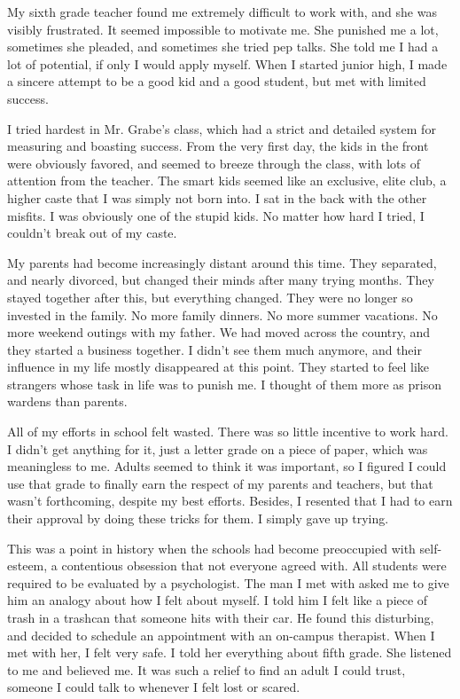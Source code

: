 My sixth grade teacher found me extremely difficult to work with, and she was visibly frustrated. It seemed impossible to motivate me. She punished me a lot, sometimes she pleaded, and sometimes she tried pep talks. She told me I had a lot of potential, if only I would apply myself. When I started junior high, I made a sincere attempt to be a good kid and a good student, but met with limited success.

I tried hardest in Mr. Grabe's class, which had a strict and detailed system for measuring and boasting success. From the very first day, the kids in the front were obviously favored, and seemed to breeze through the class, with lots of attention from the teacher. The smart kids seemed like an exclusive, elite club, a higher caste that I was simply not born into. I sat in the back with the other misfits. I was obviously one of the stupid kids. No matter how hard I tried, I couldn't break out of my caste.

My parents had become increasingly distant around this time. They separated, and nearly divorced, but changed their minds after many trying months. They stayed together after this, but everything changed. They were no longer so invested in the family. No more family dinners. No more summer vacations. No more weekend outings with my father. We had moved across the country, and they started a business together. I didn't see them much anymore, and their influence in my life mostly disappeared at this point. They started to feel like strangers whose task in life was to punish me. I thought of them more as prison wardens than parents.

All of my efforts in school felt wasted. There was so little incentive to work hard. I didn't get anything for it, just a letter grade on a piece of paper, which was meaningless to me. Adults seemed to think it was important, so I figured I could use that grade to finally earn the respect of my parents and teachers, but that wasn't forthcoming, despite my best efforts. Besides, I resented that I had to earn their approval by doing these tricks for them. I simply gave up trying.

This was a point in history when the schools had become preoccupied with self-esteem, a contentious obsession that not everyone agreed with. All students were required to be evaluated by a psychologist. The man I met with asked me to give him an analogy about how I felt about myself. I told him I felt like a piece of trash in a trashcan that someone hits with their car. He found this disturbing, and decided to schedule an appointment with an on-campus therapist. When I met with her, I felt very safe. I told her everything about fifth grade. She listened to me and believed me. It was such a relief to find an adult I could trust, someone I could talk to whenever I felt lost or scared.

